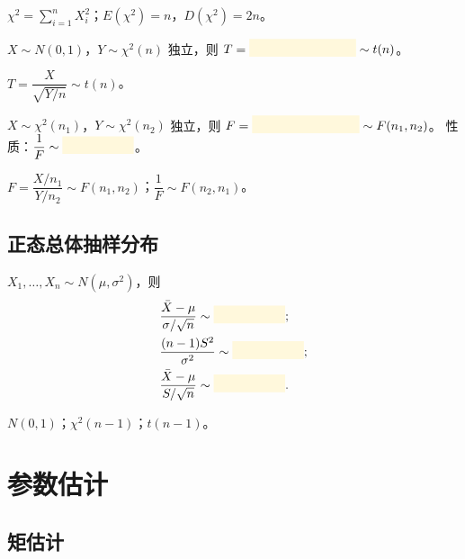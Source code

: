 \documentclass[11pt,a4paper]{article}
\newcommand{\blankbox}[1]{%
  \textcolor{blankyellow}{\rule[-0.1cm]{#1}{0.5cm}}%
}
\begin{document}
\begin{answerbox}
$\chi^2=\displaystyle\sum_{i=1}^n X_i^2$；$E(\chi^2)=n$，$D(\chi^2)=2n$。
\end{answerbox}

\begin{formulabox}[$t$ 分布]
$X\sim N(0,1)$，$Y\sim\chi^2(n)$ 独立，则 $T=\blankbox{3cm}\sim t(n)$。
\end{formulabox}

\begin{answerbox}
$T=\dfrac{X}{\sqrt{Y/n}}\sim t(n)$。
\end{answerbox}

\begin{formulabox}[$F$ 分布]
$X\sim\chi^2(n_1)$，$Y\sim\chi^2(n_2)$ 独立，则 $F=\blankbox{3cm}\sim F(n_1,n_2)$。
性质：$\dfrac{1}{F}\sim\blankbox{2cm}$。
\end{formulabox}

\begin{answerbox}
$F=\dfrac{X/n_1}{Y/n_2}\sim F(n_1,n_2)$；$\dfrac{1}{F}\sim F(n_2,n_1)$。
\end{answerbox}

\subsection{正态总体抽样分布}

\begin{formulabox}[单正态总体]
$X_1,\dots,X_n\sim N(\mu,\sigma^2)$，则
\begin{align*}
&\frac{\bar X-\mu}{\sigma/\sqrt n}\sim\blankbox{2cm}; \\
&\frac{(n-1)S^2}{\sigma^2}\sim\blankbox{2cm}; \\
&\frac{\bar X-\mu}{S/\sqrt n}\sim\blankbox{2cm}.
\end{align*}
\end{formulabox}

\begin{answerbox}
$N(0,1)$；$\chi^2(n-1)$；$t(n-1)$。
\end{answerbox}

\section{参数估计}

\subsection{矩估计}
\end{document}
